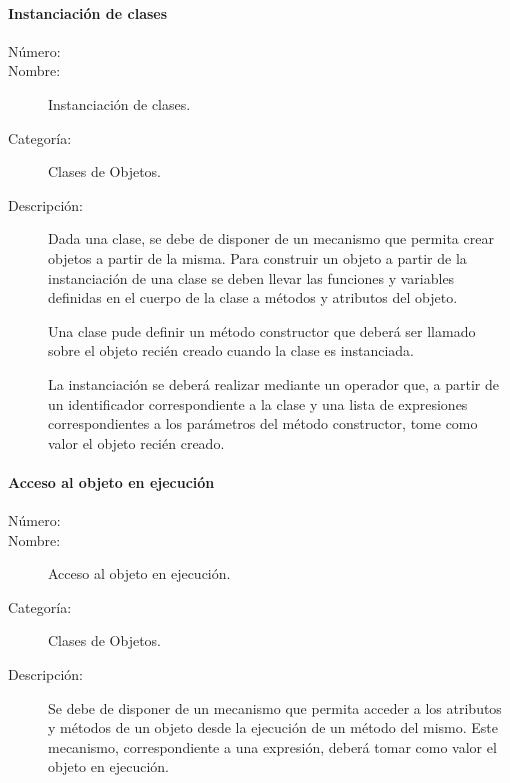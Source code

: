 \paragraph{Instanciación de clases}
\begin{framed}
	\begin{description}
		\item [Número:] \cn
		\item [Nombre:] Instanciación de clases.
		\item [Categoría:] Clases de Objetos.
		\item [Descripción:] Dada una clase, se debe de disponer de un mecanismo que permita crear objetos a partir de la misma.   
		Para construir un objeto a partir de la instanciación de una clase se deben llevar las funciones y variables definidas en el
		cuerpo de la clase a métodos y atributos del objeto. 
		
		Una clase pude definir un método constructor que deberá ser llamado sobre el objeto recién creado cuando la clase es instanciada.
		
		La instanciación se deberá realizar mediante un operador que, a partir de un identificador correspondiente a la clase y una lista de expresiones 
		correspondientes a los parámetros del método constructor, tome como valor el objeto recién creado.
	\end{description}
\end{framed}


\paragraph{Acceso al objeto en ejecución}
\begin{framed}
	\begin{description}
		\item [Número:] \cn
		\item [Nombre:] Acceso al objeto en ejecución.
		\item [Categoría:] Clases de Objetos.
		\item [Descripción:] Se debe de disponer de un mecanismo que permita acceder a los atributos y métodos de un objeto desde la ejecución 
		de un método del mismo. Este mecanismo, correspondiente a una expresión, deberá tomar como valor el objeto en ejecución. 
	\end{description}
\end{framed}

